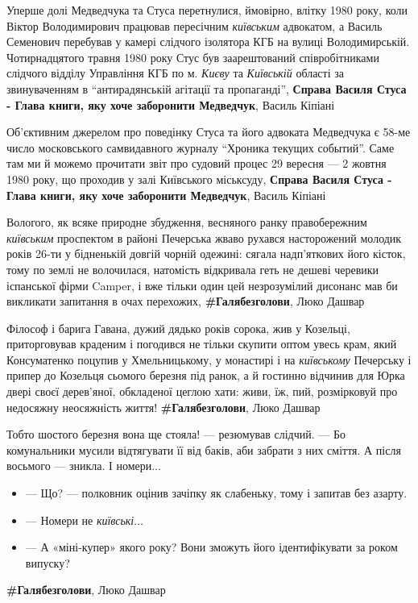 Уперше долі Медведчука та Стуса перетнулися, ймовірно, влітку 1980 року, коли
Віктор Володимирович працював пересічним \emph{київським} адвокатом, а Василь
Семенович перебував у камері слідчого ізолятора КГБ на вулиці Володимирській.
Чотирнадцятого травня 1980 року Стус був заарештований співробітниками слідчого
відділу Управління КГБ по м. \emph{Києву} та \emph{Київській} області за
звинуваченням в \enquote{антирадянській агітації та пропаганді}, 
\textbf{Справа Василя Стуса - Глава книги, яку хоче заборонити Медведчук},
Василь Кіпіані

Об'єктивним джерелом про поведінку Стуса та його адвоката Медведчука є 58-ме
число московського самвидавного журналу \enquote{Хроника текущих событий}. Саме
там ми й можемо прочитати звіт про судовий процес 29 вересня — 2 жовтня 1980
року, що проходив у залі Київського міськсуду, \textbf{Справа Василя Стуса -
Глава книги, яку хоче заборонити Медведчук}, Василь Кіпіані 

Вологого, як всяке природне збудження, весняного ранку правобережним
\emph{київським} проспектом в районі Печерська жваво рухався насторожений
молодик років 26-ти у бідненькій довгій чорній одежині: сягала надп'яткових
його кісток, тому по землі не волочилася, натомість відкривала геть не дешеві
черевики іспанської фірми Camper, і вже тільки один цей незрозумілий дисонанс
мав би викликати запитання в очах перехожих, \textbf{\#Галябезголови}, Люко
Дашвар

Філософ і барига Гавана, дужий дядько років сорока, жив у Козельці,
приторговував краденим і погодився не тільки скупити оптом увесь крам, який
Консуматенко поцупив у Хмельницькому, у монастирі і на \emph{київському} Печерську і
припер до Козельця сьомого березня під ранок, а й гостинно відчинив для Юрка
двері своєї дерев'яної, обкладеної цеглою хати: живи, їж, пий, розмірковуй про
недосяжну неосяжність життя!
\textbf{\#Галябезголови}, Люко Дашвар

Тобто шостого березня вона ще стояла! — резюмував слідчий. — Бо комунальники
мусили відтягувати її від баків, аби забрати з них сміття. А після восьмого —
зникла. І номери...
\begin{itemize}
\item — Що? — полковник оцінив зачіпку як слабеньку, тому і запитав без азарту.
\item — Номери не \emph{київські}...
\item — А «міні-купер» якого року? Вони зможуть його ідентифікувати за роком випуску?
\end{itemize}
\textbf{\#Галябезголови}, Люко Дашвар

